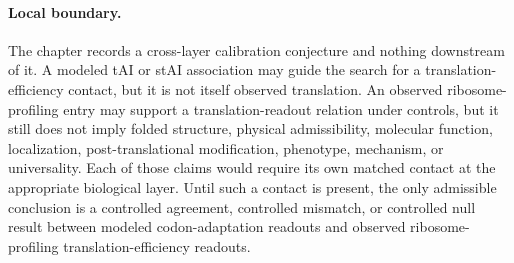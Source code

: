 \paragraph{Local boundary.}
The chapter records a cross-layer calibration conjecture and nothing downstream of it.  A modeled tAI or stAI association may guide the search for a translation-efficiency contact, but it is not itself observed translation.  An observed ribosome-profiling entry may support a translation-readout relation under controls, but it still does not imply folded structure, physical admissibility, molecular function, localization, post-translational modification, phenotype, mechanism, or universality.  Each of those claims would require its own matched contact at the appropriate biological layer.  Until such a contact is present, the only admissible conclusion is a controlled agreement, controlled mismatch, or controlled null result between modeled codon-adaptation readouts and observed ribosome-profiling translation-efficiency readouts.
